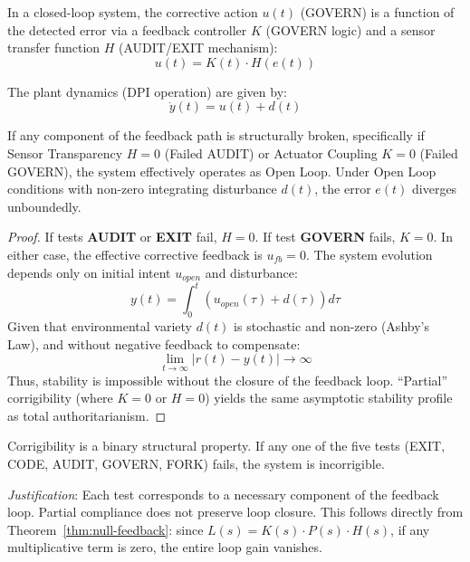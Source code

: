 In a closed-loop system, the corrective action $u(t)$ (GOVERN) is a function of the detected error via a feedback controller $K$ (GOVERN logic) and a sensor transfer function $H$ (AUDIT/EXIT mechanism):
\begin{equation}
u(t) = K(t) \cdot H(e(t))
\end{equation}

The plant dynamics (DPI operation) are given by:
\begin{equation}
\dot{y}(t) = u(t) + d(t)
\end{equation}

\begin{theorem}
\label{thm:null-feedback}
If any component of the feedback path is structurally broken, specifically if Sensor Transparency $H=0$ (Failed AUDIT) or Actuator Coupling $K=0$ (Failed GOVERN), the system effectively operates as Open Loop. Under Open Loop conditions with non-zero integrating disturbance $d(t)$, the error $e(t)$ diverges unboundedly.
\end{theorem}

\begin{proof}
If tests \textbf{AUDIT} or \textbf{EXIT} fail, $H=0$.
If test \textbf{GOVERN} fails, $K=0$.
In either case, the effective corrective feedback is $u_{fb} = 0$.
The system evolution depends only on initial intent $u_{open}$ and disturbance:
\begin{equation}
y(t) = \int_0^t (u_{open}(\tau) + d(\tau)) d\tau
\end{equation}
Given that environmental variety $d(t)$ is stochastic and non-zero (Ashby's Law), and without negative feedback to compensate:
\begin{equation}
\lim_{t \to \infty} |r(t) - y(t)| \to \infty
\end{equation}
Thus, stability is impossible without the closure of the feedback loop. ``Partial'' corrigibility (where $K=0$ or $H=0$) yields the same asymptotic stability profile as total authoritarianism.
\end{proof}

\begin{corollary}
Corrigibility is a binary structural property. If any one of the five tests (EXIT, CODE, AUDIT, GOVERN, FORK) fails, the system is incorrigible.
\end{corollary}

\textit{Justification}: Each test corresponds to a necessary component of the feedback loop. Partial compliance does not preserve loop closure. This follows directly from Theorem~\ref{thm:null-feedback}: since $L(s) = K(s) \cdot P(s) \cdot H(s)$, if any multiplicative term is zero, the entire loop gain vanishes.

